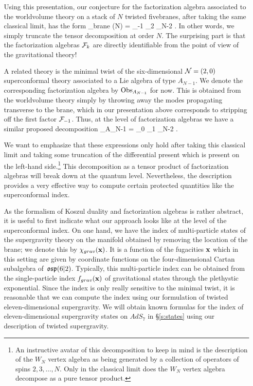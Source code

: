\documentclass[11pt]{amsart}
\begin{document}
Using this presentation, our conjecture for the factorization algebra associated to the worldvolume theory on a stack of $N$ twisted fivebranes, after taking the same classical limit, has the form
\beqn\label{eqn:finiteTensor}
\Obs_{brane} (N) = \cF_{-1} \otimes \cF_2 \otimes \cdots \otimes \cF_{N-2} .
\eeqn
In other words, we simply truncate the tensor decomposition at order $N$.
The surprising part is that the factorization algebras $\mathcal F_k$ are directly identifiable from the point of view of the gravitational theory!

A related theory is the minimal twist of the six-dimensional $\mathcal N=(2,0)$ superconformal theory associated to a Lie algebra of type $A_{N-1}$.
We denote the corresponding factorization algebra by $\operatorname{Obs}_{A_{N-1}}$ for now. 
This is obtained from the worldvolume theory simply by throwing away the modes propagating transverse to the brane, which in our presentation above corresponds to stripping off the first factor $\mathcal F_{-1}$. 
Thus, at the level of factorization algebras we have a similar proposed decomposition
\beqn
\Obs_{A_{N-1}} = \cF_0 \otimes \cF_1 \otimes \cdots \otimes \cF_{N-2} .
\eeqn

We want to emphasize that these expressions only hold after taking this classical limit and taking some truncation of the differential present which is present on the left-hand side.\footnote{An instructive avatar of this decomposition to keep in mind is the description of the $W_N$ vertex algebra as being generated by a collection of operators of spins $2,3,\ldots, N$.
Only in the classical limit does the $W_N$ vertex algebra decompose as a pure tensor product.}
This decomposition as a tensor product of factorization algebras will break down at the quantum level.
Nevertheless, the description provides a very effective way to compute certain protected quantities like the superconformal index.

As the formalism of Koszul duality and factorization algebras is rather abstract, it is useful to first indicate what our approach looks like at the level of the superconformal index. 
On one hand, we have the index of multi-particle states of the supergravity theory on the manifold obtained by removing the location of the brane; we denote this by $\chi_{grav}({\bf x})$.
It is a function of the fugacities ${\bf x}$ which in this setting are given by coordinate functions on the four-dimensional Cartan subalgebra of~$\mathfrak{osp}(6|2)$.
Typically, this multi-particle index can be obtained from the single-particle index $f_{grav}({\bf x})$ of gravitational states through the plethystic exponential. 
Since the index is only really sensitive to the minimal twist, it is reasonable that we can compute the index using our formulation of twisted eleven-dimensional supergravity.
We will obtain known formulas for the index of eleven-dimensional supergravity states on $AdS_7$ in \S\ref{s:states} using our description of twisted supergravity. 
\end{document}
